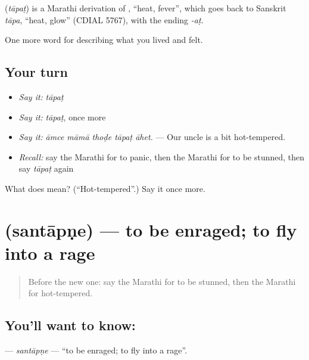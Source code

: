 \begin{cousinweb}
\textbf{} (\emph{tāpaṭ}) is a Marathi derivation of , \textquotedblleft{}heat, fever\textquotedblright{}, which goes back to Sanskrit \emph{tāpa}, \textquotedblleft{}heat, glow\textquotedblright{} (CDIAL 5767), with the ending \emph{-aṭ}.
\end{cousinweb}

\begin{grammarlens}[title={What you've built}]
One more word for describing what you lived and felt.
\end{grammarlens}

\subsection*{Your turn}
\begin{itemize}
\raggedright
  \item \emph{Say it:} \emph{tāpaṭ}
  \item \emph{Say it:} \emph{tāpaṭ}, once more
  \item \emph{Say it:} \emph{āmce māmā thoḍe tāpaṭ āhet.} — Our uncle is a bit hot-tempered.
  \item \emph{Recall:} say the Marathi for to panic, then the Marathi for to be stunned, then say \emph{tāpaṭ} again
\end{itemize}

\begin{tcolorbox}[breakable,colback=teal!4,colframe=teal!35!black,title={Before you move on}]
What does  mean? (\textquotedblleft{}Hot-tempered\textquotedblright{}.) Say it once more.
\end{tcolorbox}
\section[\texorpdfstring{\mr{संतापणे} (santāpṇe)}{संतापणे (santāpṇe)}]{ (santāpṇe) — to be enraged; to fly into a rage}

\label{lesson:MR-C453-santapne}



\begin{quote}
Before the new one: say the Marathi for to be stunned, then the Marathi for hot-tempered.
\end{quote}

\subsection*{You'll want to know: }
\textbf{} — \emph{santāpṇe} — \textquotedblleft{}to be enraged; to fly into a rage\textquotedblright{}.

